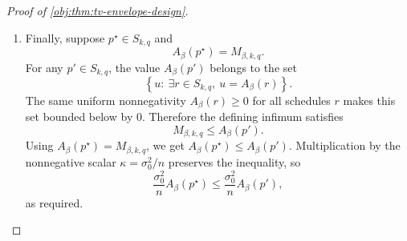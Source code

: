 \begin{proof}[Proof of \cref{obj:thm:tv-envelope-design}]
\begin{enumerate}
\item
Finally, suppose \(p^\star\in S_{k,q}\) and
\[
A_\beta(p^\star)=M_{\beta,k,q}.
\]
For any \(p'\in S_{k,q}\), the value \(A_\beta(p')\) belongs to the set
\[
\left\{u:\ \exists r\in S_{k,q},\ u=A_\beta(r)\right\}.
\]
The same uniform nonnegativity \(A_\beta(r)\ge0\) for all schedules \(r\) makes this set bounded below by \(0\). Therefore the defining infimum satisfies
\[
M_{\beta,k,q}\le A_\beta(p').
\]
Using \(A_\beta(p^\star)=M_{\beta,k,q}\), we get \(A_\beta(p^\star)\le A_\beta(p')\). Multiplication by the nonnegative scalar \(\kappa=\sigma_0^2/n\) preserves the inequality, so
\[
\frac{\sigma_0^2}{n}A_\beta(p^\star)
\le
\frac{\sigma_0^2}{n}A_\beta(p'),
\]
as required. %
\end{enumerate}
\end{proof}


